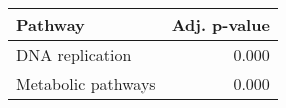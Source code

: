 \begin{tabular}{lr}
\toprule
            Pathway &  Adj. p-value \\
\midrule
    DNA replication &         0.000 \\
 Metabolic pathways &         0.000 \\
\bottomrule
\end{tabular}
